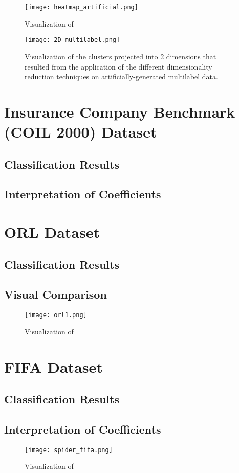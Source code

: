 \begin{figure}
    \centering
    \texttt{[image: heatmap\_artificial.png]}
    \caption{Visualization of }
    \label{fig:heatmap}
\end{figure}

\begin{figure}
    \centering
    \texttt{[image: 2D-multilabel.png]}
    \caption{Visualization of the clusters projected into 2 dimensions that resulted from the application of the different dimensionality reduction techniques on artificially-generated multilabel data.}
    \label{fig:2D_multilabel}
\end{figure}

\section{Insurance Company Benchmark (COIL 2000) Dataset}

\subsection{Classification Results}

\subsection{Interpretation of Coefficients}


\section{ORL Dataset}

\subsection{Classification Results}

\subsection{Visual Comparison}

\begin{figure}
    \centering
    \texttt{[image: orl1.png]}
    \caption{Visualization of }
    \label{fig:orl}
\end{figure}

\section{FIFA Dataset}

\subsection{Classification Results}

\subsection{Interpretation of Coefficients}

\begin{figure}
    \centering
    \texttt{[image: spider\_fifa.png]}
    \caption{Visualization of }
    \label{fig:spider_fifa}
\end{figure}

